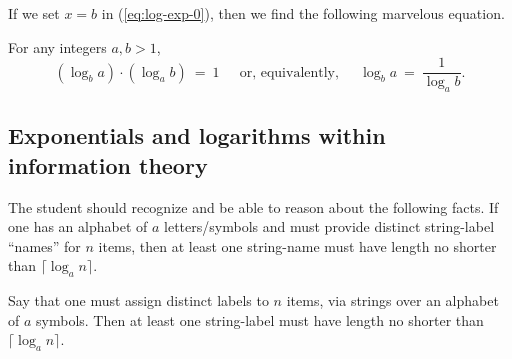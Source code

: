 If we set $x = b$ in (\ref{eq:log-exp-0}), then we find the following
marvelous equation.

\begin{prop}
For any integers $a, b >1$,
\begin{equation}
\left(\log_b a \right) \cdot \left( \log_a b \right) \ = \ 1 \ \ \ \ \
\mbox{ or, equivalently, } \ \ \ \ \
\log_b a \ = \ \frac{1}{\log_a b} .
\end{equation}
\end{prop}


\subsection{Exponentials and logarithms within information theory}
\label{sec:count-strings}

The student should recognize and be able to reason about the following
facts.  If one has an alphabet of $a$ letters/symbols and must provide
distinct string-label ``names'' for $n$ items, then at least one
string-name must have length no shorter than $\lceil \log_a n \rceil$.

\begin{prop}
\label{thm:bound-stringnames-lgth-k}
Say that one must assign distinct labels to $n$ items, via strings
over an alphabet of $a$ symbols.  Then at least one string-label must
have length no shorter than $\lceil \log_a n \rceil$.
\end{prop}

